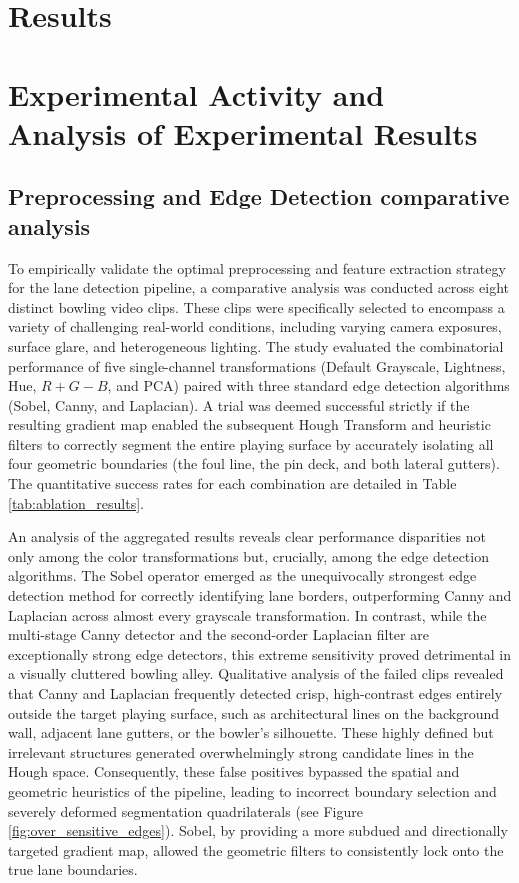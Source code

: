 \section{Results}

\section{Experimental Activity and Analysis of Experimental Results}

\subsection{Preprocessing and Edge Detection comparative analysis}

To empirically validate the optimal preprocessing and feature extraction strategy for the lane detection pipeline, a comparative analysis was conducted across eight distinct bowling video clips. These clips were specifically selected to encompass a variety of challenging real-world conditions, including varying camera exposures, surface glare, and heterogeneous lighting. The study evaluated the combinatorial performance of five single-channel transformations (Default Grayscale, Lightness, Hue, $R+G-B$, and PCA) paired with three standard edge detection algorithms (Sobel, Canny, and Laplacian). A trial was deemed successful strictly if the resulting gradient map enabled the subsequent Hough Transform and heuristic filters to correctly segment the entire playing surface by accurately isolating all four geometric boundaries (the foul line, the pin deck, and both lateral gutters). The quantitative success rates for each combination are detailed in Table \ref{tab:ablation_results}.

An analysis of the aggregated results reveals clear performance disparities not only among the color transformations but, crucially, among the edge detection algorithms. The Sobel operator emerged as the unequivocally strongest edge detection method for correctly identifying lane borders, outperforming Canny and Laplacian across almost every grayscale transformation. In contrast, while the multi-stage Canny detector and the second-order Laplacian filter are exceptionally strong edge detectors, this extreme sensitivity proved detrimental in a visually cluttered bowling alley. Qualitative analysis of the failed clips revealed that Canny and Laplacian frequently detected crisp, high-contrast edges entirely outside the target playing surface, such as architectural lines on the background wall, adjacent lane gutters, or the bowler's silhouette. These highly defined but irrelevant structures generated overwhelmingly strong candidate lines in the Hough space. Consequently, these false positives bypassed the spatial and geometric heuristics of the pipeline, leading to incorrect boundary selection and severely deformed segmentation quadrilaterals (see Figure \ref{fig:over_sensitive_edges}). Sobel, by providing a more subdued and directionally targeted gradient map, allowed the geometric filters to consistently lock onto the true lane boundaries.
 

